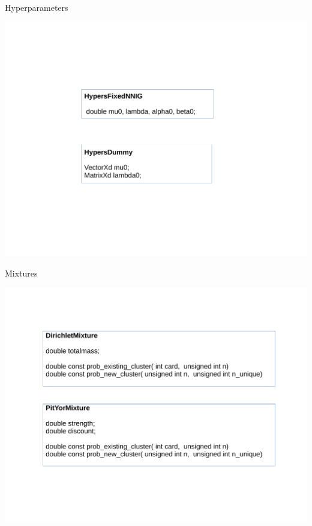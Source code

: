 \begin{frame}{Hyperparameters}
	\begin{center}
		\includegraphics[scale=0.35]{etc/hypers.pdf}
	\end{center}
\end{frame}

\begin{frame}{Mixtures}
	\begin{center}
		\includegraphics[scale=0.35]{etc/mixture.pdf}
	\end{center}

\end{frame}